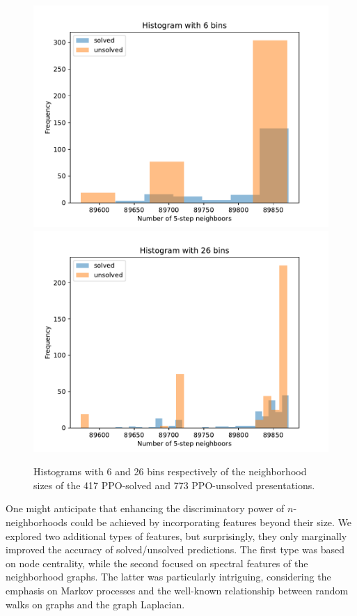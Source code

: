 \begin{figure}
	\centering
	\includegraphics[scale=.34]{fig/prime_histogram_rl.pdf}
	\includegraphics[scale=.34]{fig/prime_histogram_rl2.pdf}
	\caption{Histograms with 6 and 26 bins respectively of the neighborhood sizes of the 417 PPO-solved and 773 PPO-unsolved presentations.}
	\label{fig:prime_histogram}
\end{figure}

\medskip

One might anticipate that enhancing the discriminatory power of $n$-neighborhoods could be achieved by incorporating features beyond their size.
We explored two additional types of features, but surprisingly, they only marginally improved the accuracy of solved/unsolved predictions.
The first type was based on node centrality, while the second focused on spectral features of the neighborhood graphs.
The latter was particularly intriguing, considering the emphasis on Markov processes and the well-known relationship between random walks on graphs and the graph Laplacian.